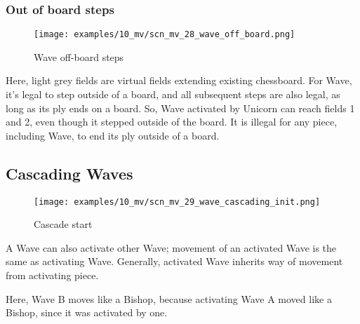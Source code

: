 \clearpage %

\subsubsection*{Out of board steps}
\label{sec:Miranda's veil/Wave/Movement/Out of board steps}

\vspace*{-1.4\baselineskip}
\noindent
\begin{figure}[!h]
\texttt{[image: examples/10\_mv/scn\_mv\_28\_wave\_off\_board.png]}
\caption{Wave off-board steps}
\label{fig:scn_mv_28_wave_off_board}
\end{figure}

Here, light grey fields are virtual fields extending existing chessboard.
For Wave, it's legal to step outside of a board, and all subsequent steps
are also legal, as long as its ply ends on a board. So, Wave activated by
Unicorn can reach fields 1 and 2, even though it stepped outside of the
board. It is illegal for any piece, including Wave, to end its ply outside
of a board.

\clearpage %

\subsection*{Cascading Waves}
\label{sec:Miranda's veil/Wave/Cascading Waves}

\vspace*{-1.4\baselineskip}
\noindent
\begin{figure}[h]
\texttt{[image: examples/10\_mv/scn\_mv\_29\_wave\_cascading\_init.png]}
\caption{Cascade start}
\label{fig:scn_mv_29_wave_cascading_init}
\end{figure}

A Wave can also activate other Wave; movement of an activated Wave is the same as
activating Wave. Generally, activated Wave inherits way of movement from activating
piece.

Here, Wave B moves like a Bishop, because activating Wave A moved like a Bishop,
since it was activated by one.

